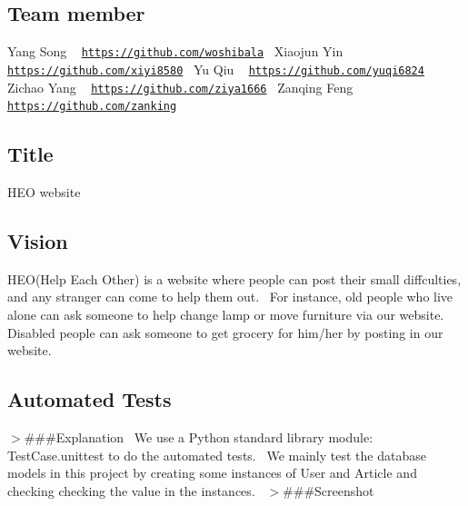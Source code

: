 \subsection*{Team member}

Yang Song ~\newline
\href{https://github.com/woshibala}{\tt https\+://github.\+com/woshibala}~\newline
 Xiaojun Yin ~\newline
\href{https://github.com/xiyi8580}{\tt https\+://github.\+com/xiyi8580}~\newline
 Yu Qiu ~\newline
\href{https://github.com/yuqi6824}{\tt https\+://github.\+com/yuqi6824}~\newline
 Zichao Yang ~\newline
\href{https://github.com/ziya1666}{\tt https\+://github.\+com/ziya1666}~\newline
 Zanqing Feng ~\newline
\href{https://github.com/zanking}{\tt https\+://github.\+com/zanking}~\newline
~\newline
 \subsection*{Title}

H\+E\+O website ~\newline
 \subsection*{Vision}

H\+E\+O(\+Help Each Other) is a website where people can post their small diffculties, and any stranger can come to help them out.~\newline
 For instance, old people who live alone can ask someone to help change lamp or move furniture via our website.~\newline
 Disabled people can ask someone to get grocery for him/her by posting in our website.~\newline
 \subsection*{Automated Tests}

$>$\#\#\#\+Explanation~\newline
 We use a Python standard library module\+: Test\+Case.\+unittest to do the automated tests.~\newline
 We mainly test the database models in this project by creating some instances of User and Article and checking checking the value in the instances.~\newline
 $>$\#\#\#\+Screenshot~\newline
 ~\newline
 ~\newline


